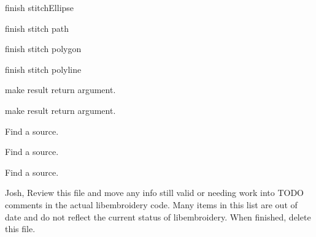 \begin{DoxyRefList}
%
finish stitch\+Ellipse  
\item[Member \mbox{\hyperlink{fill_8c_a736fce5df010bbe74ea9ad2857be9bf4}{emb\+Pattern\+\_\+stitch\+Path}} (Emb\+Pattern $\ast$p, Emb\+Path path, int thread\+\_\+index, int style)]\label{todo__todo000213}%
%
finish stitch path  
\item[Member \mbox{\hyperlink{fill_8c_a86f903495c0da7514294200680bd6414}{emb\+Pattern\+\_\+stitch\+Polygon}} (Emb\+Pattern $\ast$p, Emb\+Polygon polygon, int thread\+\_\+index, int style)]\label{todo__todo000214}%
%
finish stitch polygon  
\item[Member \mbox{\hyperlink{fill_8c_a9ae9d5d7dfbb2ab361dc37970b7eb2f2}{emb\+Pattern\+\_\+stitch\+Polyline}} (Emb\+Pattern $\ast$p, Emb\+Polyline polyline, int thread\+\_\+index, int style)]\label{todo__todo000215}%
%
finish stitch polyline  
\item[Member \mbox{\hyperlink{vector_8c_a0a4af07bfac410623cf77a35a11550b1}{emb\+Vector\+\_\+multiply}} (Emb\+Vector vector, Emb\+Real magnitude, Emb\+Vector $\ast$result)]\label{todo__todo000231}%
%
make result return argument.  
\item[Member \mbox{\hyperlink{vector_8c_aaad72d90c58592e330de08139aee5077}{emb\+Vector\+\_\+normalize}} (Emb\+Vector vector, Emb\+Vector $\ast$result)]\label{todo__todo000230}%
%
make result return argument.  
\item[File \mbox{\hyperlink{format__art_8c}{format\+\_\+art.c}} ]\label{todo__todo000232}%
%
Find a source.  
\item[File \mbox{\hyperlink{format__bmc_8c}{format\+\_\+bmc.c}} ]\label{todo__todo000233}%
%
Find a source.  
\item[File \mbox{\hyperlink{format__cnd_8c}{format\+\_\+cnd.c}} ]\label{todo__todo000234}%
%
Find a source.  
\item[Page \mbox{\hyperlink{formats}{Formats}} ]\label{todo__todo000192}%
%
Josh, Review this file and move any info still valid or needing work into TODO comments in the actual libembroidery code. Many items in this list are out of date and do not reflect the current status of libembroidery. When finished, delete this file. 
\item[Member \mbox{\hyperlink{formats_8c_a8cb11404ce46501561f956d33f8dcf95}{format\+Table}} \mbox{[}number\+Of\+Formats\mbox{]}]\label{todo__todo000216}%

\end{DoxyRefList}
